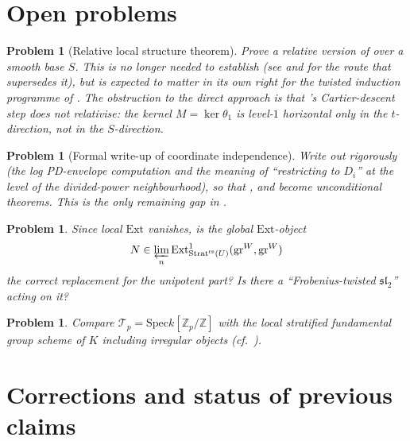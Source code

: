\documentclass[11pt,reqno]{amsart}
\newcommand{\Zp}{\mathbb{Z}_p}
\newcommand{\ZZ}{\mathbb{Z}}
\newcommand{\cT}{\mathcal{T}}
\newcommand{\Strat}{\mathrm{Strat}}
\newcommand{\rs}{\mathrm{rs}}
\newcommand{\Ext}{\mathrm{Ext}}
\newcommand{\Spec}{\mathrm{Spec}}
\newcommand{\gr}{\mathrm{gr}}
\theoremstyle{plain}
\newtheorem{problem}[theorem]{Problem}
\theoremstyle{definition}
\theoremstyle{remark}
\numberwithin{equation}{section}
\begin{document}
\section{Open problems}

\begin{problem}[Relative local structure theorem]\label{prob:relstruct}
Prove a relative version of  over a smooth base
$S$.  This is \emph{no longer needed} to establish 
(see  and  for the route that
supersedes it), but is expected to matter in its own right for the
twisted induction programme of .  The obstruction
to the direct approach is that 's Cartier-descent step
does not relativise: the kernel $M=\ker\theta_1$ is level-$1$ horizontal
only in the $t$-direction, not in the $S$-direction.
\end{problem}

\begin{problem}[Formal write-up of coordinate independence]\label{prob:coordfreewriteup}
Write out  rigorously (the log PD-envelope
computation and the meaning of ``restricting to $D_i$'' at the level of
the divided-power neighbourhood), so that ,
 and  become unconditional theorems.
This is the only remaining gap in .
\end{problem}

\begin{problem}
Since local $\Ext$ vanishes, is the global $\Ext$-object
\[
   N\in\varprojlim_n\Ext^1_{\Strat^{\rs}(U)}(\gr^W,\gr^W)
\]
the correct replacement for the unipotent part?  Is there a
``Frobenius-twisted $\mathfrak{sl}_2$'' acting on it?
\end{problem}

\begin{problem}
Compare $\cT_p=\Spec k[\Zp/\ZZ]$ with the local stratified fundamental
group scheme of $K$ including irregular objects
(cf.\ ).
\end{problem}

\section{Corrections and status of previous claims}\label{sec:corrections}
\end{document}
